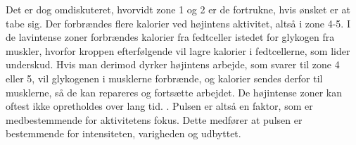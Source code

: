 Det er dog omdiskuteret, hvorvidt zone 1 og 2 er de fortrukne, hvis ønsket er at tabe sig. Der forbrændes flere kalorier ved højintens aktivitet, altså i zone 4-5. I de lavintense zoner forbrændes kalorier fra fedtceller istedet for glykogen fra muskler, hvorfor kroppen efterfølgende vil lagre kalorier i fedtcellerne, som lider underskud. Hvis man derimod dyrker højintens arbejde, som svarer til zone 4 eller 5, vil glykogenen i musklerne forbrænde, og kalorier sendes derfor til musklerne, så de kan repareres og fortsætte arbejdet. De højintense zoner kan oftest ikke opretholdes over lang tid.  \citep{Martini2012,Leyland2007,Heartratejournal2015}. \newline
Pulsen er altså en faktor, som er medbestemmende for aktivitetens fokus. Dette medfører at pulsen er bestemmende for intensiteten, varigheden og udbyttet.